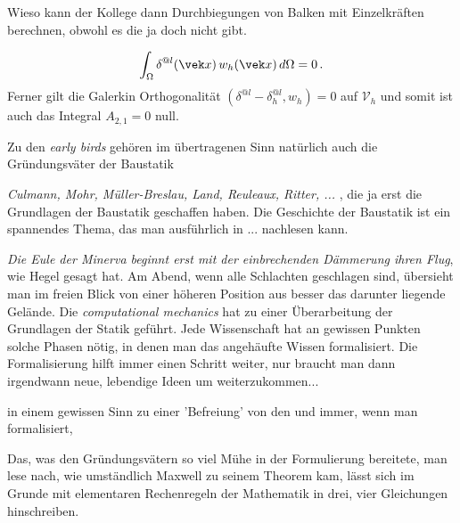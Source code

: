 {{{Wieso kann der Kollege dann Durchbiegungen von Balken mit Einzelkr\"{a}ften  berechnen, obwohl es die ja doch nicht gibt.



\begin{align}
\int_{\Omega} \delta^{@l}(\vek x)\,w_h(\vek x)\,d\Omega = 0\,.
\end{align}
Ferner gilt die Galerkin Orthogonalit\"{a}t $(\delta^{@l} - \delta_h^{@l},w_h) = 0$ auf $\mathcal{V}_h$ und somit ist auch das Integral $A_{2,1} = 0$ null.

Zu den {\em early birds\/} geh\"{o}ren im \"{u}bertragenen Sinn nat\"{u}rlich auch die Gr\"{u}ndungsv\"{a}ter der Baustatik {{\em Culmann, Mohr, M\"{u}ller-Breslau, Land, Reuleaux, Ritter, ... \/}, die ja erst die Grundlagen der Baustatik geschaffen haben. Die Geschichte der Baustatik ist ein spannendes Thema, das man ausf\"{u}hrlich in ... nachlesen kann.

{\em Die Eule der Minerva beginnt erst mit der einbrechenden D\"{a}mmerung ihren Flug\/}, wie Hegel gesagt hat. Am Abend, wenn alle Schlachten geschlagen sind, \"{u}bersieht man im freien Blick von einer h\"{o}heren Position aus besser das darunter liegende Gel\"{a}nde. Die {\em computational mechanics\/} hat zu einer \"{U}berarbeitung der Grundlagen der Statik gef\"{u}hrt. Jede Wissenschaft hat an gewissen Punkten solche Phasen n\"{o}tig, in denen man das angeh\"{a}ufte Wissen formalisiert. Die Formalisierung hilft immer einen Schritt weiter, nur braucht man dann irgendwann neue, lebendige Ideen um weiterzukommen...

in einem gewissen Sinn zu einer 'Befreiung' von den  und immer, wenn man formalisiert,

Das, was den Gr\"{u}ndungsv\"{a}tern so viel M\"{u}he in der Formulierung bereitete, man lese nach, wie umst\"{a}ndlich Maxwell zu seinem Theorem kam, l\"{a}sst sich im Grunde mit elementaren Rechenregeln der Mathematik in drei, vier Gleichungen hinschreiben.

}}}}
